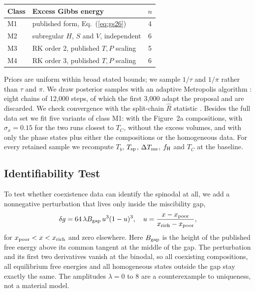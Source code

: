 \begin{table}[t]
\label{tab:classes}
\small\centering
\begin{tabular}{@{}llc@{}}
\toprule
Class & Excess Gibbs energy & $n$\\
\midrule
M1 & published form, Eq.~(\ref{eq:gs26}) & 4\\
M2 & subregular $H$, $S$ and $V$, independent & 6\\
M3 & RK order 2, published $T,P$ scaling & 5\\
M4 & RK order 3, published $T,P$ scaling & 6\\
\bottomrule
\end{tabular}
\end{table}

Priors are uniform within broad stated bounds; we sample $1/\tau$ and $1/\pi$ rather than
$\tau$ and $\pi$. We draw posterior samples with an adaptive Metropolis algorithm
\cite{haario2001}: eight chains of 12,000 steps, of which the first 3,000 adapt the proposal
and are discarded. We check convergence with the split-chain $\hat R$ statistic
\cite{gelman2013}. Besides the full data set we fit five variants of class M1: with the
Figure~2a compositions, with $\sigma_x = 0.15$ for the two runs closest to $T_C$, without
the excess volumes, and with only the phase states plus either the compositions or the
homogeneous data. For every retained sample we recompute $T_b$, $T_{\rm sp}$,
$\Delta T_{\rm ms}$, $f_{\rm H}$ and $T_C$ at the baseline.

\subsection{Identifiability Test}

To test whether coexistence data can identify the spinodal at all, we add a nonnegative
perturbation that lives only inside the miscibility gap,
\begin{equation}
\delta g = 64\,\lambda B_{\rm gap}\, u^3(1-u)^3,\quad
u = \frac{x-x_{\rm poor}}{x_{\rm rich}-x_{\rm poor}},
\label{eq:bump}
\end{equation}
for $x_{\rm poor}<x<x_{\rm rich}$ and zero elsewhere. Here $B_{\rm gap}$ is the height of the
published free energy above its common tangent at the middle of the gap. The perturbation and
its first two derivatives vanish at the binodal, so all coexisting compositions, all
equilibrium free energies and all homogeneous states outside the gap stay exactly the same.
The amplitudes $\lambda = 0$ to 8 are a counterexample to uniqueness, not a material model.

